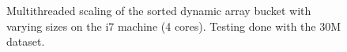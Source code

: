 \begin{landscape}
\begin{figure}[H]
{    }
    \label{fig:ts_i7_30m_sorted}
    \caption{Multithreaded scaling of the sorted dynamic array bucket with varying sizes on the
    i7 machine (4 cores). Testing done with the 30M dataset.}
\end{figure}
\begin{figure}[H]
\end{figure}
\end{landscape}
